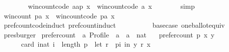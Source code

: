 \begin{isabellebody}
\ \ \ \ \ \ \ \ win{\isacharunderscore}{\kern0pt}count{\isacharunderscore}{\kern0pt}code\ {\isacharparenleft}{\kern0pt}aa{\isacharhash}{\kern0pt}p{\isacharparenright}{\kern0pt}\ x\ {\isacharplus}{\kern0pt}\ win{\isacharunderscore}{\kern0pt}count{\isacharunderscore}{\kern0pt}code\ {\isacharbrackleft}{\kern0pt}a{\isacharbrackright}{\kern0pt}\ x{\isachardoublequoteclose}\isanewline
\ \ \ \ \ \ \isamarkupfalse%
\ simp\isanewline
\ \ \isamarkupfalse%
\isanewline
\ \ \isamarkupfalse%
\ {\isachardoublequoteopen}win{\isacharunderscore}{\kern0pt}count\ {\isacharparenleft}{\kern0pt}p{\isacharat}{\kern0pt}{\isacharbrackleft}{\kern0pt}a{\isacharbrackright}{\kern0pt}{\isacharparenright}{\kern0pt}\ x\ {\isacharequal}{\kern0pt}\ win{\isacharunderscore}{\kern0pt}count{\isacharunderscore}{\kern0pt}code\ {\isacharparenleft}{\kern0pt}p{\isacharat}{\kern0pt}{\isacharbrackleft}{\kern0pt}a{\isacharbrackright}{\kern0pt}{\isacharparenright}{\kern0pt}\ x{\isachardoublequoteclose}\isanewline
\ \ \ \ \isamarkupfalse%
\ pref{\isacharunderscore}{\kern0pt}count{\isacharunderscore}{\kern0pt}code{\isacharunderscore}{\kern0pt}induct\ pref{\isacharunderscore}{\kern0pt}count{\isacharunderscore}{\kern0pt}induct\isanewline
\ \ \ \ \ \ \ \ \ \ base{\isacharunderscore}{\kern0pt}case\ one{\isacharunderscore}{\kern0pt}ballot{\isacharunderscore}{\kern0pt}equiv\isanewline
\ \ \ \ \isamarkupfalse%
\ presburger\isanewline
{}\isamarkupfalse%
%
\endisatagproof
{\isafoldproof}%
%
\isadelimproof
\isanewline
%
\endisadelimproof
\isanewline
{}\isamarkupfalse%
\ prefer{\isacharunderscore}{\kern0pt}count\ {\isacharcolon}{\kern0pt}{\isacharcolon}{\kern0pt}\ {\isachardoublequoteopen}{\isacharprime}{\kern0pt}a\ Profile\ {\isasymRightarrow}\ {\isacharprime}{\kern0pt}a\ {\isasymRightarrow}\ {\isacharprime}{\kern0pt}a\ {\isasymRightarrow}\ nat{\isachardoublequoteclose}\ \isanewline
\ \ {\isachardoublequoteopen}prefer{\isacharunderscore}{\kern0pt}count\ p\ x\ y\ {\isacharequal}{\kern0pt}\isanewline
\ \ \ \ \ \ card\ {\isacharbraceleft}{\kern0pt}i{\isacharcolon}{\kern0pt}{\isacharcolon}{\kern0pt}nat{\isachardot}{\kern0pt}\ i\ {\isacharless}{\kern0pt}\ length\ p\ {\isasymand}\ {\isacharparenleft}{\kern0pt}let\ r\ {\isacharequal}{\kern0pt}\ {\isacharparenleft}{\kern0pt}p{\isacharbang}{\kern0pt}i{\isacharparenright}{\kern0pt}\ in\ {\isacharparenleft}{\kern0pt}y\ {\isasympreceq}\isactrlsub r\ x{\isacharparenright}{\kern0pt}{\isacharparenright}{\kern0pt}{\isacharbraceright}{\kern0pt}{\isachardoublequoteclose}\isanewline

\end{isabellebody}
